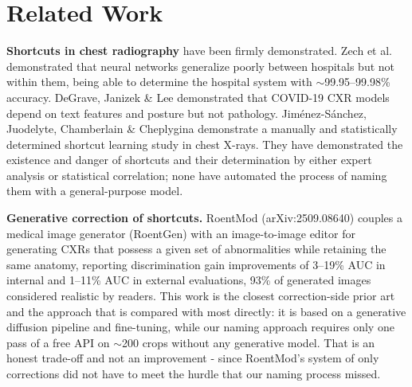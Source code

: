 \documentclass{ieeeaccess}
\begin{document}
\section{Related Work}
\textbf{Shortcuts in chest radiography} have been firmly demonstrated. Zech et al.\ \cite{zech2018} demonstrated that neural networks generalize poorly between hospitals but not within them, being able to determine the hospital system with $\sim$99.95--99.98\% accuracy. DeGrave, Janizek \& Lee \cite{degrave2021} demonstrated that COVID-19 CXR models depend on text features and posture but not pathology. Jim\'enez-S\'anchez, Juodelyte, Chamberlain \& Cheplygina \cite{jimenez2023} demonstrate a manually and statistically determined shortcut learning study in chest X-rays. They have demonstrated the existence and danger of shortcuts and their determination by either expert analysis or statistical correlation; none have automated the process of naming them with a general-purpose model.

\textbf{Generative correction of shortcuts.}
RoentMod (arXiv:2509.08640) \cite{roentmod} couples a medical image generator (RoentGen) with an image-to-image editor for generating CXRs that possess a given set of abnormalities while retaining the same anatomy, reporting discrimination gain improvements of 3--19\% AUC in internal and 1--11\% AUC in external evaluations, 93\% of generated images considered realistic by readers. This work is the closest correction-side prior art and the approach that is compared with most directly: it is based on a generative diffusion pipeline and fine-tuning, while our naming approach requires only one pass of a free API on $\sim$200 crops without any generative model. That is an honest trade-off and not an improvement - since RoentMod's system of only corrections did not have to meet the hurdle that our naming process missed.
\end{document}
